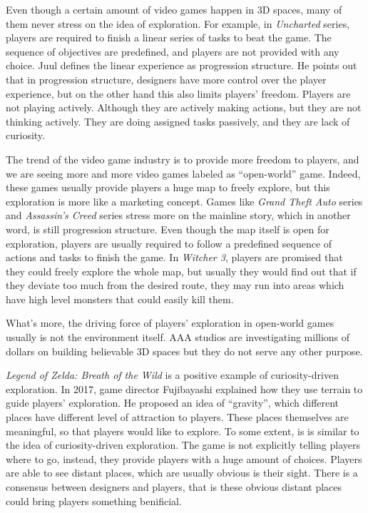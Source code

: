\documentclass[doc, biblatex]{apa6}
\begin{document}
Even though a certain amount of video games happen in 3D spaces, many of them
never stress on the idea of exploration. For example, in \textit{Uncharted}
series, players are required to finish a linear series of tasks to beat the
game. The sequence of objectives are predefined, and players are not provided
with any choice. Juul defines the linear experience as progression
structure\parencite{juul2002open}. He points out that in progression structure,
designers have more control over the player experience, but on the other hand
this also limits players' freedom. Players are not playing actively. Although
they are actively making actions, but they are not thinking actively. They are
doing assigned tasks passively, and they are lack of curiosity.

The trend of the video game industry is to provide more freedom to players, and
we are seeing more and more video games labeled as ``open-world'' game. Indeed,
these games usually provide players a huge map to freely explore, but this
exploration is more like a marketing concept. Games like \textit{Grand Theft
  Auto} series and \textit{Assassin's Creed} series stress more on the mainline
story, which in another word, is still progression structure. Even though the
map itself is open for exploration, players are usually required to follow a
predefined sequence of actions and tasks to finish the game. In \textit{Witcher
  3}, players are promised that they could freely explore the whole map, but
usually they would find out that if they deviate too much from the desired
route, they may run into areas which have high level monsters that could easily
kill them.

What's more, the driving force of players' exploration in open-world games
usually is not the environment itself. AAA studios are investigating millions of
dollars on building believable 3D spaces but they do not serve any other
purpose.

\textit{Legend of Zelda: Breath of the Wild} is a positive example of
curiosity-driven exploration. In 2017, game director Fujibayashi explained how
they use terrain to guide players' exploration\parencite{cdedc2017}. He proposed
an idea of ``gravity'', which different places have different level of
attraction to players. These places themselves are meaningful, so that players
would like to explore. To some extent, is is similar to the idea of
curiosity-driven exploration. The game is not explicitly telling players where
to go, instead, they provide players with a huge amount of choices. Players are
able to see distant places, which are usually obvious is their sight. There
is a consensus between designers and players, that is these obvious distant
places could bring players something benificial.
\end{document}
